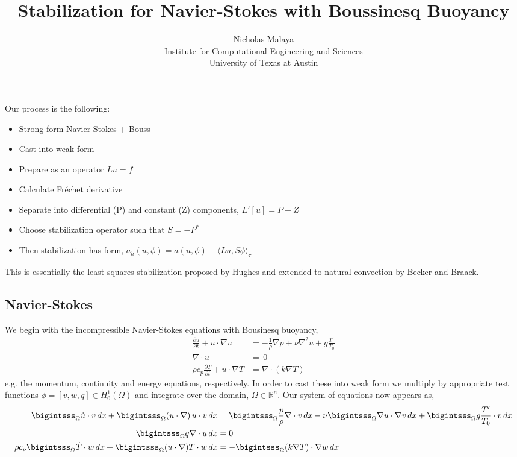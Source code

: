 \documentclass{article}
\title{\bf{Stabilization for Navier-Stokes with Boussinesq Buoyancy}}
\author{Nicholas Malaya \\ Institute for Computational Engineering and Sciences \\ University of Texas at Austin} \date{}
\begin{document}
\maketitle

%
%
Our process is the following: 

\begin{itemize}
 \item Strong form Navier Stokes + Bouss
 \item Cast into weak form
 \item Prepare as an operator $Lu=f$
 \item Calculate Fr\'echet derivative
 \item Separate into differential (P) and constant (Z) components,
       $L'[u] = P + Z$
 \item Choose stabilization operator such that $S = -P^*$
 \item Then stabilization has form, $a_h(u,\phi) = a(u,\phi) + \langle
       Lu,S\phi \rangle_\tau$
\end{itemize}

This is essentially the least-squares stabilization proposed by Hughes
and extended to natural convection by Becker and Braack. 

%
%
\newpage

\subsection{Navier-Stokes}

We begin with the incompressible Navier-Stokes equations with Bousinesq
buoyancy,
\begin{align}
 \frac{\partial u}{\partial t} + u \cdot \nabla u &= -\frac{1}{\rho}
 \nabla p + \nu \nabla^2 u + g \frac{T'}{T_0} \\
 \nabla \cdot u &= \, 0 \\
 \rho c_p \frac{\partial T}{\partial t} + u \cdot \nabla T &= \nabla
 \cdot (k \nabla T)
\end{align}
e.g. the momentum, continuity and energy equations, respectively. In
order to cast these into weak form we multiply by appropriate test
functions $\phi = \left[v,w,q\right] \in H^1_0(\Omega)$ and integrate over
the domain, $\Omega \in \mathbb{R}^n$. Our system of equations now
appears as, 
\begin{align}
 \bigintsss_\Omega \dot u \cdot v \, dx +
 \bigintsss_\Omega  (u \cdot \nabla) \, u \cdot v \, dx &=
 \bigintsss_\Omega \frac{p}{\rho} \nabla \cdot v \, dx - \nu \bigintsss_\Omega \nabla u \cdot \nabla v
 \,dx + \bigintsss_\Omega g \frac{T'}{T_0} \cdot v \, dx \\ 
  \bigintsss_\Omega q \nabla \cdot u \, dx &= 0 \\
 \rho c_p \bigintsss_\Omega \dot T \cdot w \, dx + \bigintsss_\Omega (u
 \cdot \nabla) T \cdot w \, dx  &= -\bigintsss_\Omega (k \nabla T) \cdot
 \nabla w \, dx
\end{align}
\end{document}
